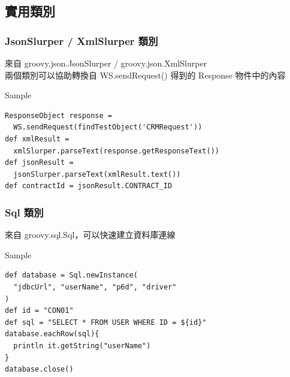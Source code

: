 \documentclass{beamer}
\begin{document}
\subsection{實用類別}
\begin{frame}[fragile]
    \frametitle{JsonSlurper / XmlSlurper 類別}
    來自 groovy.json.JsonSlurper / groovy.json.XmlSlurper
    ~\\
    兩個類別可以協助轉換自 WS.sendRequest() 得到的 Response 物件中的內容
    \begin{block}{Sample}
\begin{lstlisting}
ResponseObject response =
  WS.sendRequest(findTestObject('CRMRequest'))
def xmlResult = 
  xmlSlurper.parseText(response.getResponseText())
def jsonResult = 
  jsonSlurper.parseText(xmlResult.text())
def contractId = jsonResult.CONTRACT_ID
\end{lstlisting}
    \end{block}
\end{frame}
\begin{frame}[fragile]
    \frametitle{Sql 類別}
    來自 groovy.sql.Sql，可以快速建立資料庫連線
    \begin{block}{Sample}
\begin{lstlisting}
def database = Sql.newInstance(
  "jdbcUrl", "userName", "p6d", "driver"
)
def id = "CON01"
def sql = "SELECT * FROM USER WHERE ID = ${id}"
database.eachRow(sql){
  println it.getString("userName")
}
database.close()
\end{lstlisting}
    \end{block}
\end{frame}
\ifx\allfiles\undefined
\end{document}
